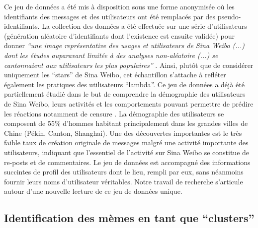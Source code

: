 Ce jeu de données a été mis à disposition sous une forme anonymisée o\`u les identifiants des messages et des utilisateurs ont été remplacés par des pseudo-identifiants. La collection des données a été effectuée sur une série d{\textquoteright}utilisateurs (génération aléatoire d{\textquoteright}identifiants dont l{\textquoteright}existence est ensuite validée) pour donner \textit{{\textquotedblleft}une image représentative des usages et utilisateurs de Sina Weibo (...) dont les études auparavant limitée à des analyses non-aléatoire (...) se cantonnaient aux utilisateurs les plus populaires{\textquotedblright} }\citep{Fu2013}. Ainsi, plut\^ot que de considérer uniquement les {\textquotedblleft}stars{\textquotedblright} de Sina Weibo, cet échantillon s{\textquoteright}attache à refléter également les pratiques des utilisateurs {\textquotedblleft}lambda{\textquotedblright}. Ce jeu de données a déjà été partiellement étudié dans le but de comprendre la démographie des utilisateurs de Sina Weibo, leurs activités et les comportements pouvant permettre de prédire les réactions notamment de censure \citep{Fu2013}. La démographie des utilisateurs se composent de 55\% d{\textquoteright}hommes habitant principalement dans les grandes villes de Chine (Pékin, Canton, Shanghai). Une des découvertes importantes est le très faible taux de création originale de messages malgré une activité importante des utilisateurs, indiquant que l{\textquoteright}essentiel de l{\textquoteright}activité sur Sina Weibo se constitue de re-posts et de commentaires. Le jeu de données est accompagné des informations succintes de profil des utilisateurs dont le lieu, rempli par eux, sans néanmoins fournir leurs noms d{\textquoteright}utilisateur véritables. Notre travail de recherche s{\textquoteright}articule autour d{\textquoteright}une nouvelle lecture de ce jeu de données unique.


\subsection[Identification des mèmes en tant que {\textquotedblleft}clusters{\textquotedblright}]{Identification des mèmes en tant que {\textquotedblleft}clusters{\textquotedblright}}

